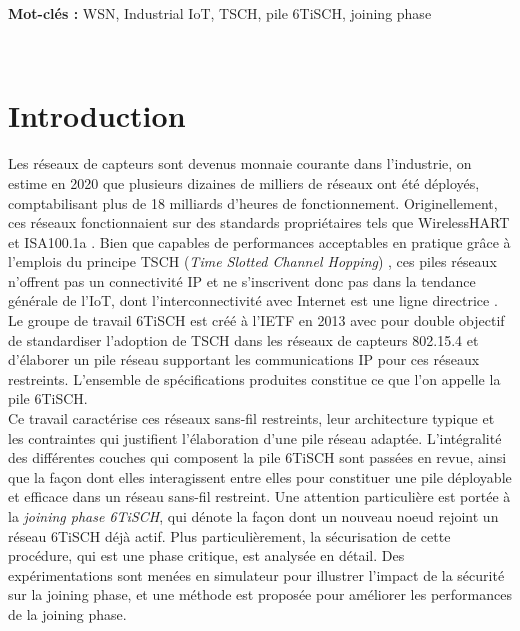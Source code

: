 \documentclass[]{report}
\begin{document}
\vspace{2cm}

\textbf{Mot-clés :} WSN, Industrial IoT, TSCH, pile 6TiSCH, joining phase 

\normalsize

\newpage
~
\newpage

\tableofcontents

\newpage


\section*{Introduction}


Les réseaux de capteurs sont devenus monnaie courante dans l'industrie, on estime en 2020 que plusieurs dizaines de milliers de réseaux ont été déployés, comptabilisant plus de 18 milliards d'heures de fonctionnement. Originellement, ces réseaux fonctionnaient sur des standards propriétaires tels que WirelessHART et ISA100.1a \cite{stack-IoT}. Bien que capables de performances acceptables en pratique grâce à l'emplois du principe TSCH (\textit{Time Slotted Channel Hopping}) \cite{decentralized}, ces piles réseaux n'offrent pas un connectivité IP et ne s'inscrivent donc pas dans la tendance générale de l'IoT, dont l'interconnectivité avec Internet est une ligne directrice \cite{stack-IoT}. Le groupe de travail 6TiSCH est créé à l'IETF en 2013 avec pour double objectif de standardiser l'adoption de TSCH dans les réseaux de capteurs 802.15.4 et d'élaborer un pile réseau supportant les communications IP pour ces réseaux restreints. L'ensemble de spécifications produites constitue ce que l'on appelle la pile 6TiSCH.\\

Ce travail caractérise ces réseaux sans-fil restreints, leur architecture typique et les contraintes qui justifient l'élaboration d'une pile réseau adaptée. L'intégralité des différentes couches qui composent la pile 6TiSCH sont passées en revue, ainsi que la façon dont elles interagissent entre elles pour constituer une pile déployable et efficace dans un réseau sans-fil restreint. Une attention particulière est portée à la \textit{joining phase 6TiSCH}, qui dénote la façon dont un nouveau noeud rejoint un réseau 6TiSCH déjà actif. Plus particulièrement, la sécurisation de cette procédure, qui est une phase critique, est analysée en détail. Des expérimentations sont menées en simulateur pour illustrer l'impact de la sécurité sur la joining phase, et une méthode est proposée pour améliorer les performances de la joining phase.\\
\end{document}
